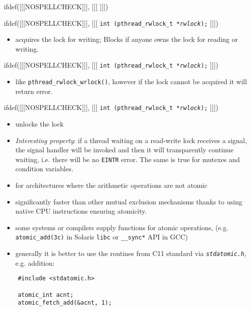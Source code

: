 
ifdef([[[NOSPELLCHECK]]], [[[
]]])

\begin{slide}
\prgchars
ifdef([[[NOSPELLCHECK]]], [[[
\texttt{int (pthread\_rwlock\_t *\emph{rwlock});}
]]])
\begin{itemize}
\item acquires the lock for writing; Blocks if anyone owns the lock for reading
or writing.
\end{itemize}
ifdef([[[NOSPELLCHECK]]], [[[
\texttt{int (pthread\_rwlock\_t *\emph{rwlock});}
]]])
\begin{itemize}
\item like \texttt{pthread\_rwlock\_wrlock()}, however if the lock cannot be
acquired it will return error.
\end{itemize}
ifdef([[[NOSPELLCHECK]]], [[[
\texttt{int (pthread\_rwlock\_t *\emph{rwlock});}
]]])
\begin{itemize}
\item unlocks the lock
\end{itemize}
\end{slide}

\begin{itemize}
\item \emph{Interesting property}: if a thread waiting on a read-write lock
receives a signal, the signal handler will be invoked and then it will
transparently continue waiting, i.e. there will be no \texttt{EINTR} error.
The same is true for mutexes and condition variables.
\end{itemize}



\begin{slide}
\begin{itemize}
\item for architectures where the arithmetic operations are not atomic
\item significantly faster than other mutual exclusion mechanisms
thanks to using native CPU instructions ensuring atomicity.
\item some systems or compilers supply functions for atomic operations,
(e.g. \texttt{atomic\_add(3c)} in Solaris \texttt{libc} or
\texttt{\_\_sync*} API in GCC)
\item generally it is better to use the routines from C11 standard
via \emph{\texttt{stdatomic.h}}, e.g. addition:
\end{itemize}
\begin{verbatim}
    #include <stdatomic.h>

    atomic_int acnt;
    atomic_fetch_add(&acnt, 1);
\end{verbatim}
\end{slide}


